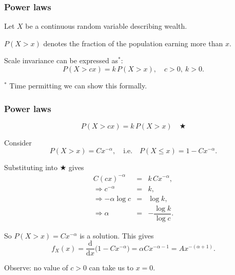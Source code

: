 \documentclass[t,8pt]{beamer}
\begin{document}
\begin{frame}
	\frametitle{Power laws}
	
	Let $X$ be a continuous random variable describing wealth. \par
	$P(X>x)$ denotes the fraction of the population earning more than $x$. \par
	
	Scale invariance can be expressed as$^*$:
	\[
	P(X>cx)=k\,P(X>x),\quad c>0,\ k>0.
	\]
	
	\vspace{5pt}
	\begin{center}
	\end{center}
	
	$^*$ Time permitting we can show this formally.
\end{frame}

\begin{frame}
	\frametitle{Power laws}
	
	\color{gray}
	\[
	P(X>cx)=k\,P(X>x)\quad\bigstar
	\]
	\color{black}
	
	Consider
	\[
	P(X>x)=C x^{-\alpha},
	\quad\text{i.e.}\quad
	P(X\leq x)=1-Cx^{-\alpha}.
	\]
	
	Substituting into $\bigstar$ gives
	\begin{eqnarray*}
		C (cx)^{-\alpha}
		&=& k\,C x^{-\alpha},\\[4pt]
		\Rightarrow c^{-\alpha}
		&=& k,\\[4pt]
		\Rightarrow -\alpha\log c
		&=& \log k,\\[4pt]
		\Rightarrow \alpha
		&=& -\dfrac{\log k}{\log c}.
	\end{eqnarray*}
	
	So $P(X>x)=C x^{-\alpha}$ is a solution. This gives
	\[
	f_X(x)=\frac{\mathrm{d}}{\mathrm{d}x}\big(1-Cx^{-\alpha}\big)
	=\alpha C x^{-\alpha-1}
	=A x^{-(\alpha+1)}.
	\]
	
	Observe: no value of $c>0$ can take us to $x=0$.
\end{frame}
\end{document}
